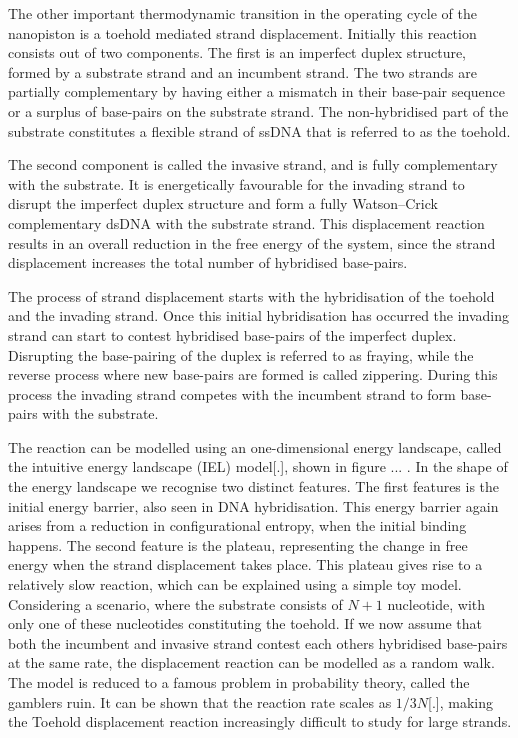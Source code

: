The other important thermodynamic transition in the operating cycle of the nanopiston
is a toehold mediated strand displacement. Initially this reaction consists out of two
components. The first is an imperfect duplex structure, formed by a substrate strand and
an incumbent strand. The two strands are partially complementary by having either a
mismatch in their base-pair sequence or a surplus of base-pairs on the substrate strand.
The non-hybridised part of the substrate constitutes a flexible strand of ssDNA
that is referred to as the toehold.

The second component is called the invasive strand, and is fully complementary with the
substrate. It is energetically favourable for the invading
strand to disrupt the imperfect duplex structure and form a fully Watson–Crick
complementary dsDNA with the substrate strand. This displacement reaction results in an
overall reduction in the free energy of the system, since the strand displacement
increases the total number of hybridised base-pairs.

The process of strand displacement starts with the hybridisation of the toehold and the
invading strand. Once this initial hybridisation has occurred the invading strand can
start to contest hybridised base-pairs of the imperfect duplex. Disrupting the
base-pairing of the duplex is referred to as fraying, while the reverse process
where new base-pairs are formed is called zippering. During this process the invading
strand competes with the incumbent strand to form base-pairs with the substrate.

The reaction can be modelled using an one-dimensional energy landscape, called the
intuitive energy landscape (IEL) model[.], shown in figure ... . In the shape of the
energy landscape we recognise two distinct features. The first features is the initial
energy barrier, also seen in DNA hybridisation. This energy barrier again arises from a
reduction in configurational entropy, when the initial binding happens. The second
feature
is the plateau, representing the change in free energy when the strand
displacement takes place. This plateau gives rise to a relatively slow reaction, which
can be explained using a simple toy model. Considering a scenario, where the substrate
consists of $N+1$ nucleotide, with only one of these nucleotides constituting the
toehold. If we now assume that both the incumbent and invasive strand contest each others
hybridised base-pairs at the same rate, the displacement reaction can be modelled as a
random walk. The model is reduced to a famous problem in probability theory, called the
gamblers ruin. It can be shown that the reaction rate scales as $1/3N$[.], making the
Toehold displacement reaction increasingly difficult to study for large strands.

